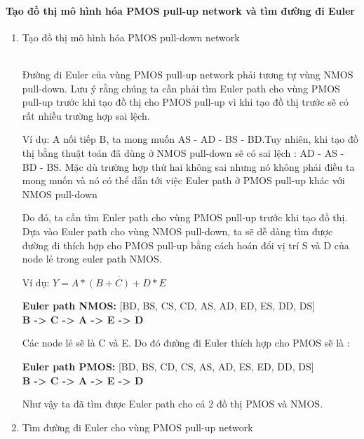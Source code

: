 \documentclass[a4paper,12pt]{article}
\begin{document}
\paragraph{Tạo đồ thị mô hình hóa PMOS pull-up network và tìm đường đi Euler}
\begin{enumerate}[label=\alph*.]
    \item{Tạo đồ thị mô hình hóa PMOS pull-down network}
    \\
Đường đi Euler của vùng PMOS pull-up network phải tương tự vùng NMOS pull-down.
Lưu ý rằng chúng ta cần phải tìm Euler path cho vùng PMOS pull-up trước khi tạo
đồ thị cho PMOS pull-up vì khi tạo đồ thị trước sẽ có rất nhiều trường hợp sai lệch.

Ví dụ: A nối tiếp B, ta mong muốn AS - AD - BS - BD.Tuy nhiên, khi tạo đồ thị
bằng thuật toán đã dùng ở NMOS pull-down sẽ có sai lệch : AD - AS - BD - BS. 
Mặc dù trường hợp thứ hai không sai nhưng nó không phải điều ta mong muốn và nó 
có thể dẫn tới việc Euler path ở PMOS pull-up khác với NMOS pull-down

Do đó, ta cần tìm Euler path cho vùng PMOS pull-up trước khi tạo đồ thị. Dựa vào 
Euler path cho vùng NMOS pull-down, ta sẽ dễ dàng tìm được đường đi thích hợp cho PMOS
pull-up bằng cách hoán đổi vị trí S và D của node lẻ trong euler path NMOS.

Ví dụ: \textbf{\( Y = \overline{A *(B + C) + D * E} \)}
\begin{center}
    \textbf{Euler path NMOS: } [BD, BS, CS, CD, AS, AD, ED, ES, DD, DS]\\
    \textbf{B -> C -> A -> E -> D}
\end{center}

Các node lẻ sẽ là C và E. Do đó đường đi Euler thích hợp cho PMOS sẽ là :
\begin{center}
    \textbf{Euler path PMOS: } [BD, BS, CD, CS, AS, AD, ES, ED, DD, DS]\\
    \textbf{B -> C -> A -> E -> D}
\end{center}

Như vậy ta đã tìm được Euler path cho cả 2 đồ thị PMOS và NMOS.
    \item{Tìm đường đi Euler cho vùng PMOS pull-up network}


\end{enumerate}
\end{document}
